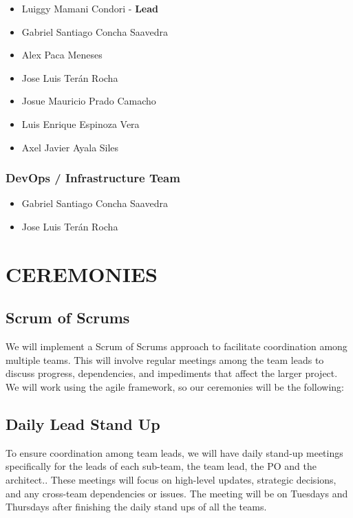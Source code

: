 \documentclass{article}
\providecommand{\tightlist}{
  \setlength{\itemsep}{0pt}\setlength{\parskip}{0pt}}
\begin{document}
\begin{itemize}
\tightlist
\item
  Luiggy Mamani Condori - \textbf{Lead}
\item
  Gabriel Santiago Concha Saavedra
\item
  Alex Paca Meneses
\item
  Jose Luis Terán Rocha
\item
  Josue Mauricio Prado Camacho
\item
  Luis Enrique Espinoza Vera
\item
  Axel Javier Ayala Siles
\end{itemize}

\subsubsection{DevOps / Infrastructure Team}\label{devops-team-4}

\begin{itemize}
\tightlist
\item
  Gabriel Santiago Concha Saavedra
\item
  Jose Luis Terán Rocha
\end{itemize}

\newpage

\hypertarget{ceremonies}{
\section{CEREMONIES}\label{ceremonies}}

\hypertarget{scrumofscrums}{
\subsection{Scrum of Scrums}\label{scrumofscrums}}

We will implement a Scrum of Scrums approach to facilitate coordination
among multiple teams. This will involve regular meetings among the team
leads to discuss progress, dependencies, and impediments that affect the
larger project.\\
We will work using the agile framework, so our ceremonies will be the
following:~

\hypertarget{dailyleadstandup}{
\subsection{Daily Lead Stand Up}\label{dailyleadstandup}}

To ensure coordination among team leads, we will have daily stand-up
meetings specifically for the leads of each sub-team, the team lead, the
PO and the architect.. These meetings will focus on high-level updates,
strategic decisions, and any cross-team dependencies or issues. The
meeting will be on Tuesdays and Thursdays after finishing the daily
stand ups of all the teams.
\end{document}
